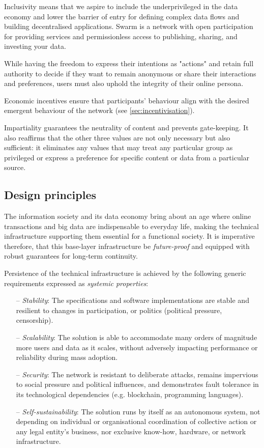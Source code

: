 Inclusivity means that we aspire to include the underprivileged in the data economy and lower the barrier of entry for defining complex data flows and building decentralised applications. Swarm is a network with open participation for providing services and permissionless access to publishing, sharing, and investing your data.

While having the freedom to express their intentions as "actions" and retain full authority to decide if they want to remain anonymous or share their interactions and preferences, users must also uphold the integrity of their online persona. 

Economic incentives ensure that participants' behaviour align with the desired emergent behaviour of the network (see \ref{sec:incentivisation}). 

Impartiality guarantees the neutrality of content and prevents gate-keeping. It also reaffirms that the other three values are not only necessary but also sufficient: it eliminates any values that may treat any particular group as privileged or express a preference for specific content or data from a particular source. 

\subsection{Design principles \statusorange}\label{sec:design-principles}
 

The information society and its data economy bring about an age where online transactions and big data are indispensable to everyday life, making the technical infrastructure supporting them essential for a functional society. It is imperative therefore, that this base-layer infrastructure be \emph{future-proof} and equipped with robust guarantees for long-term continuity. 

Persistence of the technical infrastructure is achieved by the following generic requirements expressed as \emph{systemic properties}:

\begin{itemize}[noitemsep]
\item[--] \emph{Stability}\/: The specifications and software implementations are stable and resilient to changes in participation, or politics (political pressure, censorship).
\item[--] \emph{Scalability}\/: The solution is able to accommodate many orders of magnitude more users and data as it scales, without adversely impacting performance or reliability during mass adoption.  
\item[--] \emph{Security}\/: The network is resistant to deliberate attacks, remains impervious to social pressure and political influences, and demonstrates fault tolerance in its technological dependencies (e.g. blockchain, programming languages). 
\item[--] \emph{Self-sustainability}\/: The solution runs by itself as an autonomous system, not depending on individual or organisational coordination of collective action or any legal entity's business, nor exclusive know-how, hardware, or network infrastructure. 
\end{itemize}





